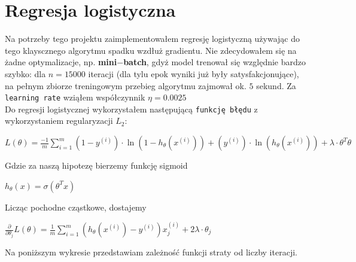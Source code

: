 \documentclass[polish,12pt,a4paper]{extarticle}
\begin{document}
\section*{Regresja logistyczna}
Na potrzeby tego projektu zaimplementowałem regresję logistyczną używając do tego klayscznego algorytmu spadku wzdłuż gradientu. Nie zdecydowałem się na żadne optymalizacje, np. \textbf{mini$-$batch}, gdyż model trenował się względnie bardzo szybko: dla $n = 15000$ iteracji (dla tylu epok wyniki już były satysfakcjonujące), na pełnym zbiorze treningowym przebieg algorytmu zajmował ok. $5$ sekund. Za \texttt{learning rate} wziąłem współczynnik $\eta = 0.0025$ \smallskip \\
Do regresji logistycznej wykorzystałem następującą \texttt{funkcję błędu} z wykorzystaniem regularyzacji $L_2$:
\begin{center}
    $L(\theta) = \frac{-1}{m}\sum_{i=1}^m (1 - y^{(i)}) \cdot \ln(1 - h_{\theta}(x^{(i)})) + (y^{(i)}) \cdot \ln(h_{\theta}(x^{(i)})) + \lambda \cdot \theta^T \theta $
\end{center}
Gdzie za naszą hipotezę bierzemy funkcję sigmoid
\begin{center}
    $h_{\theta}(x) = \sigma(\theta^Tx)$
\end{center}
Licząc pochodne cząstkowe, dostajemy
\begin{center}
    $\frac{\partial}{\partial \theta_j} L(\theta) = \frac{1}{m}\sum_{i=1}^m (h_{\theta}(x^{(i)}) - y^{(i)}) x_j^{(i)} + 2\lambda \cdot \theta_j$
\end{center}
Na poniższym wykresie przedstawiam zależność funkcji straty od liczby iteracji. \\
\end{document}

